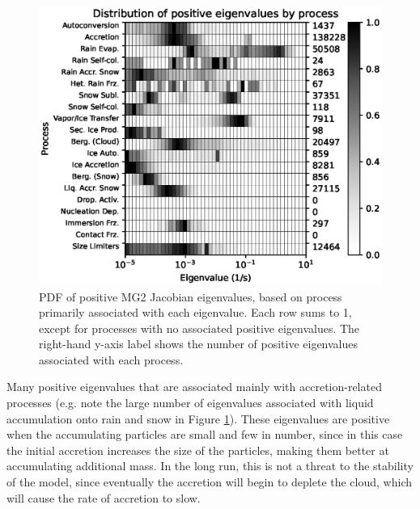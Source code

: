 \documentclass [11pt, proquest] {uwthesis}[2020/02/24]
\begin{document}
\begin{figure}[htbp]
  \includegraphics[width=6.5in]{./time_hist_process_2D_pos.eps}
  \caption[PDF of positive eigenvalues of the Jacobian of MG2, separated by process]{PDF of positive MG2 Jacobian eigenvalues, based on process primarily associated with each eigenvalue. Each row sums to \num{1}, except for processes with no associated positive eigenvalues. The right-hand y-axis label shows the number of positive eigenvalues associated with each process.}
  \label{process-2D-pos-eig}
\end{figure}

Many positive eigenvalues that are associated mainly with accretion-related processes (e.g. note the large number of eigenvalues associated with liquid accumulation onto rain and snow in Figure \ref{process-2D-pos-eig}). These eigenvalues are positive when the accumulating particles are small and few in number, since in this case the initial accretion increases the size of the particles, making them better at accumulating additional mass. In the long run, this is not a threat to the stability of the model, since eventually the accretion will begin to deplete the cloud, which will cause the rate of accretion to slow.
\end{document}
